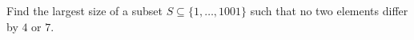 Find the largest size of a subset $S\subseteq\{1,\ldots,1001\}$ such that no two elements differ by $4$ or $7$.
